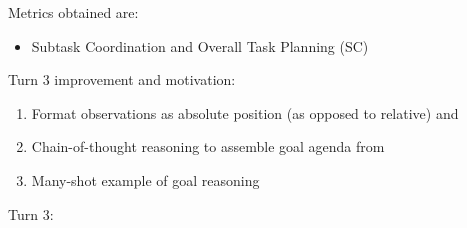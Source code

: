 Metrics obtained are:
\begin{itemize}
    \item Subtask Coordination and Overall Task Planning (SC)
\end{itemize}

Turn 3 improvement and motivation:
\begin{enumerate}
    \item Format observations as absolute position (as opposed to relative) and 
    \item Chain-of-thought reasoning to assemble goal agenda from
    \item Many-shot example of goal reasoning
\end{enumerate}


Turn 3: